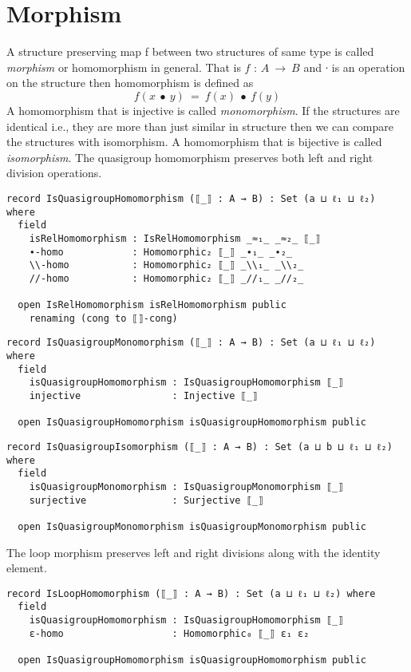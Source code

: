 \section{Morphism}
A structure preserving map f between two structures of same type is called
\textit{morphism} or homomorphism in general. That is \(f\) : \(A \ \rightarrow \
B\) and ∙ is an operation on the structure then homomorphism is defined as
\[f(x\  ∙ \  y) \ = \ f(x) \ ∙ \  f(y)\] A homomorphism that is injective is
called \textit{monomorphism}. If the structures are identical i.e., they are
more than just similar in structure then we can compare the structures with
isomorphism. A homomorphism that is bijective is called \textit{isomorphism}.
The quasigroup homomorphism preserves both left and right division operations.
\begin{verbatim}
record IsQuasigroupHomomorphism (⟦_⟧ : A → B) : Set (a ⊔ ℓ₁ ⊔ ℓ₂) where
  field
    isRelHomomorphism : IsRelHomomorphism _≈₁_ _≈₂_ ⟦_⟧
    ∙-homo            : Homomorphic₂ ⟦_⟧ _∙₁_ _∙₂_
    \\-homo           : Homomorphic₂ ⟦_⟧ _\\₁_ _\\₂_
    //-homo           : Homomorphic₂ ⟦_⟧ _//₁_ _//₂_

  open IsRelHomomorphism isRelHomomorphism public
    renaming (cong to ⟦⟧-cong)
\end{verbatim}
\begin{verbatim}
record IsQuasigroupMonomorphism (⟦_⟧ : A → B) : Set (a ⊔ ℓ₁ ⊔ ℓ₂) where
  field
    isQuasigroupHomomorphism : IsQuasigroupHomomorphism ⟦_⟧
    injective                : Injective ⟦_⟧

  open IsQuasigroupHomomorphism isQuasigroupHomomorphism public
\end{verbatim}
\begin{verbatim}
record IsQuasigroupIsomorphism (⟦_⟧ : A → B) : Set (a ⊔ b ⊔ ℓ₁ ⊔ ℓ₂) where
  field
    isQuasigroupMonomorphism : IsQuasigroupMonomorphism ⟦_⟧
    surjective               : Surjective ⟦_⟧

  open IsQuasigroupMonomorphism isQuasigroupMonomorphism public
\end{verbatim}
The loop morphism preserves left and right divisions along with the identity
element.
\begin{verbatim}
record IsLoopHomomorphism (⟦_⟧ : A → B) : Set (a ⊔ ℓ₁ ⊔ ℓ₂) where
  field
    isQuasigroupHomomorphism : IsQuasigroupHomomorphism ⟦_⟧
    ε-homo                   : Homomorphic₀ ⟦_⟧ ε₁ ε₂

  open IsQuasigroupHomomorphism isQuasigroupHomomorphism public
\end{verbatim}

